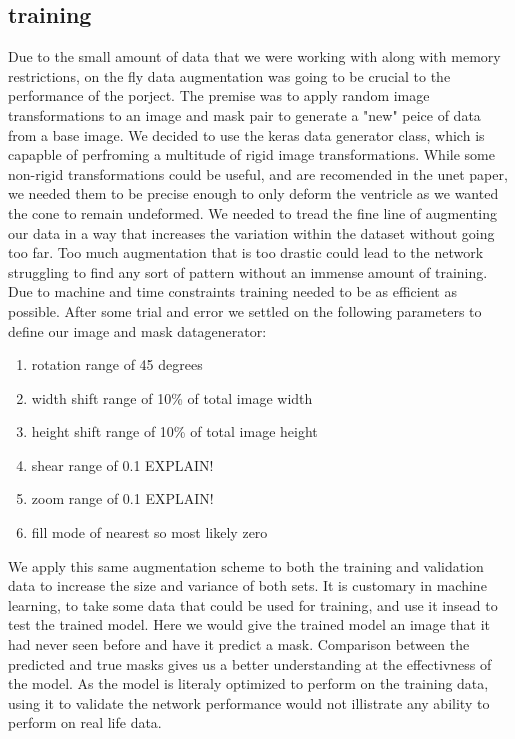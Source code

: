 \documentclass[12pt]{article}
\begin{document}
\subsection{training}
Due to the small amount of data that we were working with along with memory restrictions, on the fly data augmentation was going to be crucial to the performance of the porject.
The premise was to apply random image transformations to an image and mask pair to generate a "new" peice of data from a base image.
We decided to use the keras data generator class, which is capapble of perfroming a multitude of rigid image transformations. 
While some non-rigid transformations could be useful, and are recomended in the unet paper, we needed them to be precise enough to only deform the ventricle as we wanted the cone to remain undeformed.
We needed to tread the fine line of augmenting our data in a way that increases the variation within the dataset without going too far.
Too much augmentation that is too drastic could lead to the network struggling to find any sort of pattern without an immense amount of training.
Due to machine and time constraints training needed to be as efficient as possible.
After some trial and error we settled on the following parameters to define our image and mask datagenerator:

\begin{enumerate}
	\item{rotation range of 45 degrees}
	\item{width shift range of 10\% of total image width}
	\item{height shift range of 10\% of total image height}
	\item{shear range of 0.1 EXPLAIN!}
	\item{zoom range of 0.1 EXPLAIN!}
	\item{fill mode of nearest so most likely zero}
\end{enumerate}

We apply this same augmentation scheme to both the training and validation data to increase the size and variance of both sets.
It is customary in machine learning, to take some data that could be used for training, and use it insead to test the trained model.
Here we would give the trained model an image that it had never seen before and have it predict a mask.
Comparison between the predicted and true masks gives us a better understanding at the effectivness of the model.
As the model is literaly optimized to perform on the training data, using it to validate the network performance would not illistrate any ability to perform on real life data.
\end{document}
